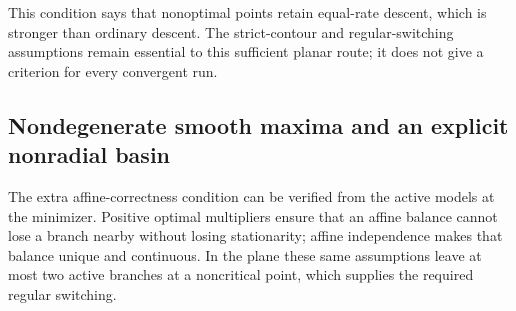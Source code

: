 This condition says that nonoptimal points retain equal-rate descent, which
is stronger than ordinary descent. The strict-contour and regular-switching
assumptions remain essential to this sufficient planar route; it does not
give a criterion for every convergent run.

\subsection{Nondegenerate smooth maxima and an explicit nonradial basin}

The extra affine-correctness condition can be verified from the active
models at the minimizer. Positive optimal multipliers ensure that an affine
balance cannot lose a branch nearby without losing stationarity; affine
independence makes that balance unique and continuous. In the plane these
same assumptions leave at most two active branches at a noncritical point,
which supplies the required regular switching.

